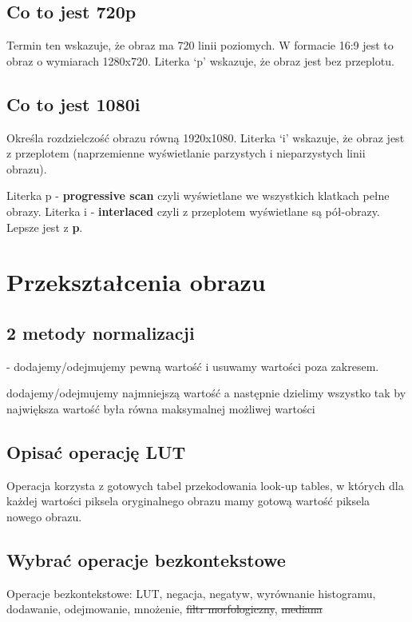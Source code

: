 \documentclass[a4paper, 12pt, titlepage]{article}
\begin{document}
\subsection{Co to jest 720p}
Termin ten wskazuje, że obraz ma 720 linii poziomych. W formacie 16:9 jest to
obraz o wymiarach 1280x720. Literka ‘p’ wskazuje, że obraz jest bez przeplotu.

\subsection{Co to jest 1080i}
Określa rozdzielczość obrazu równą 1920x1080. Literka ‘i’ wskazuje, że obraz jest
z przeplotem (naprzemienne wyświetlanie parzystych i nieparzystych linii obrazu). \par
Literka p - \textbf{progressive scan} czyli wyświetlane we wszystkich klatkach pełne
obrazy. Literka i - \textbf{interlaced} czyli z przeplotem wyświetlane są pół-obrazy.
Lepsze jest z \textbf{p}.

\pagebreak\section{Przekształcenia obrazu}

\subsection{2 metody normalizacji}
\begin{description}[noitemsep]
	\item[Skalowanie z obcięciem] - dodajemy/odejmujemy pewną wartość i usuwamy wartości poza zakresem.
	\item[Skalowanie bez obcięcia] dodajemy/odejmujemy najmniejszą wartość a następnie dzielimy wszystko tak by największa wartość była równa maksymalnej możliwej wartości
\end{description}

\subsection{Opisać operację LUT}
Operacja korzysta z gotowych tabel przekodowania look-up tables, w których dla każdej wartości piksela oryginalnego obrazu mamy gotową wartość piksela nowego obrazu.

\subsection{Wybrać operacje bezkontekstowe}
Operacje bezkontekstowe: LUT, negacja, negatyw, wyrównanie histogramu, dodawanie, odejmowanie, mnożenie, \st{filtr morfologiczny}, \st{mediana}
\end{document}
